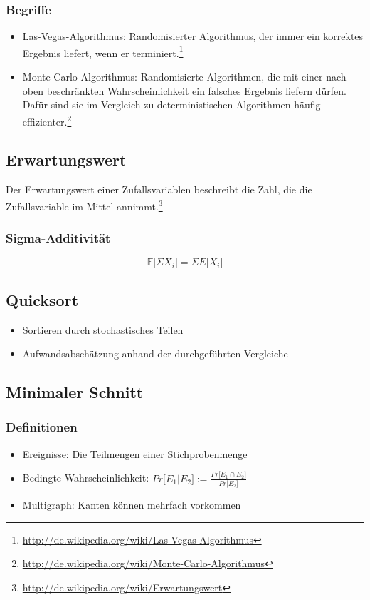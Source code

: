 \subsubsection{Begriffe}
\begin{itemize}
	\item Las-Vegas-Algorithmus: Randomisierter Algorithmus, der immer ein korrektes Ergebnis liefert, wenn er terminiert.\footnote{\url{http://de.wikipedia.org/wiki/Las-Vegas-Algorithmus}}
	\item Monte-Carlo-Algorithmus: Randomisierte Algorithmen, die mit einer nach oben beschränkten Wahrscheinlichkeit ein falsches Ergebnis liefern dürfen. Dafür sind sie im Vergleich zu deterministischen Algorithmen häufig effizienter.\footnote{\url{http://de.wikipedia.org/wiki/Monte-Carlo-Algorithmus}}
\end{itemize}

\subsection{Erwartungswert}
Der Erwartungswert einer Zufallsvariablen beschreibt die Zahl, die die Zufallsvariable im Mittel annimmt.\footnote{\url{http://de.wikipedia.org/wiki/Erwartungswert}}

\subsubsection{Sigma-Additivität}
\[\mathbb{E}\lbrack \Sigma X_i\rbrack = \Sigma E \lbrack X_i\rbrack\]


\subsection{Quicksort}
\begin{itemize}
	\item Sortieren durch stochastisches Teilen
	\item Aufwandsabschätzung anhand der durchgeführten Vergleiche
\end{itemize}


\subsection{Minimaler Schnitt}

\subsubsection{Definitionen}
\begin{itemize}
	\item Ereignisse: Die Teilmengen einer Stichprobenmenge
	\item Bedingte Wahrscheinlichkeit: \(Pr \lbrack E_1 | E_2 \rbrack := \frac{Pr\lbrack E_1 \cap E_2 \rbrack}{Pr\lbrack E_2 \rbrack} \)
	\item Multigraph: Kanten können mehrfach vorkommen
\end{itemize}

